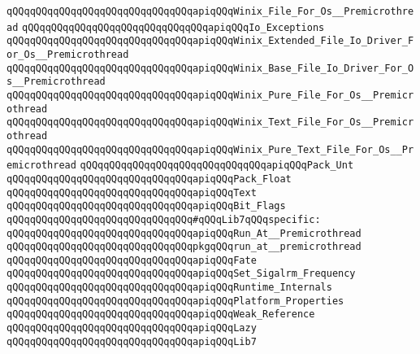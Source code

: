 \verb|qQQqqQQqqQQqqQQqqQQqqQQqqQQqqQQqapiqQQqWinix_File_For_Os__Premicrothread|\newline
\verb|qQQqqQQqqQQqqQQqqQQqqQQqqQQqqQQqapiqQQqIo_Exceptions|\newline
\verb|qQQqqQQqqQQqqQQqqQQqqQQqqQQqqQQqapiqQQqWinix_Extended_File_Io_Driver_For_Os__Premicrothread|\newline
\verb|qQQqqQQqqQQqqQQqqQQqqQQqqQQqqQQqapiqQQqWinix_Base_File_Io_Driver_For_Os__Premicrothread|\newline
\verb|qQQqqQQqqQQqqQQqqQQqqQQqqQQqqQQqapiqQQqWinix_Pure_File_For_Os__Premicrothread|\newline
\verb|qQQqqQQqqQQqqQQqqQQqqQQqqQQqqQQqapiqQQqWinix_Text_File_For_Os__Premicrothread|\newline
\verb|qQQqqQQqqQQqqQQqqQQqqQQqqQQqqQQqapiqQQqWinix_Pure_Text_File_For_Os__Premicrothread|\newline
\verb|qQQqqQQqqQQqqQQqqQQqqQQqqQQqqQQqapiqQQqPack_Unt|\newline
\verb|qQQqqQQqqQQqqQQqqQQqqQQqqQQqqQQqapiqQQqPack_Float|\newline
\verb|qQQqqQQqqQQqqQQqqQQqqQQqqQQqqQQqapiqQQqText|\newline
\verb|qQQqqQQqqQQqqQQqqQQqqQQqqQQqqQQqapiqQQqBit_Flags|\newline
\newline
\verb|qQQqqQQqqQQqqQQqqQQqqQQqqQQqqQQq#qQQqLib7qQQqspecific:|\newline
\newline
\verb|qQQqqQQqqQQqqQQqqQQqqQQqqQQqqQQqapiqQQqRun_At__Premicrothread|\newline
\verb|qQQqqQQqqQQqqQQqqQQqqQQqqQQqqQQqpkgqQQqrun_at__premicrothread|\newline
\newline
\verb|qQQqqQQqqQQqqQQqqQQqqQQqqQQqqQQqapiqQQqFate|\newline
\verb|qQQqqQQqqQQqqQQqqQQqqQQqqQQqqQQqapiqQQqSet_Sigalrm_Frequency|\newline
\verb|qQQqqQQqqQQqqQQqqQQqqQQqqQQqqQQqapiqQQqRuntime_Internals|\newline
\verb|qQQqqQQqqQQqqQQqqQQqqQQqqQQqqQQqapiqQQqPlatform_Properties|\newline
\verb|qQQqqQQqqQQqqQQqqQQqqQQqqQQqqQQqapiqQQqWeak_Reference|\newline
\verb|qQQqqQQqqQQqqQQqqQQqqQQqqQQqqQQqapiqQQqLazy|\newline
\verb|qQQqqQQqqQQqqQQqqQQqqQQqqQQqqQQqapiqQQqLib7|\newline
\newline
